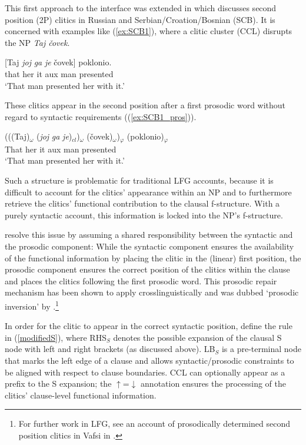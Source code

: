 \documentclass[output=paper,hidelinks]{langscibook}
\begin{document}
This first approach to the interface was extended in \citet{boegel-etal2010} which discusses second position (2P) clitics in Russian and Serbian/Croation/Bosnian (SCB). It is concerned with examples like (\ref{ex:SCB1}), where a clitic cluster (CCL) disrupts the NP {\em Taj \v{c}ovek}. 


\ea\label{ex:SCB1}
\gll 
{[}Taj {\em joj} {\em  ga} {\em je} \v{c}ovek]  poklonio. \\
\phantom{[}that her it {\sc aux} man presented\\
\glt `That man presented her with it.' \hfill \citep{Schuetze1994}
\z

\noindent These clitics appear in the second position after a first prosodic word without regard to syntactic requirements ((\ref{ex:SCB1_pros})).

\ea\label{ex:SCB1_pros}
\gll
(((Taj)$_{\omega}$ ({\em joj}  {\em ga}  {\em je})$_{cl}$)$_{\omega}$ (\v{c}ovek)$_{\omega}$)$_\varphi$ (poklonio)$_\varphi$\\
\phantom{(((}That \phantom{(}her it {\sc aux} \phantom{(}man \phantom{(}presented\\
\glt`That man presented her with it.'
\z

\noindent Such a structure is problematic for traditional LFG accounts, because it is difficult to account for the clitics' appearance within an NP and to furthermore retrieve the clitics' functional contribution to the clausal f-structure. With a purely syntactic account, this information is locked into the NP's f-structure.

\citet{boegel-etal2010} resolve this issue by assuming a shared responsibility between the syntactic and the prosodic component: While the syntactic component ensures the availability of the functional information by placing the clitic in the (linear) first position, the prosodic component ensures the correct position of the clitics within the clause and places the clitics following the first prosodic word. This prosodic repair mechanism has been shown to apply crosslinguistically and was dubbed `prosodic inversion' by \citet{Halpern95}.\footnote{For further work in LFG, see an account of prosodically determined second position clitics in Vafsi in \citet{Boegeletal2018}.}

In order for the clitic to appear in the correct syntactic position, \citet{boegel-etal2010} define the rule in (\ref{modifiedS}), where  RHS$_S$ denotes the possible expansion of the clausal S node with left and right brackets (as discussed above).   LB$_S$ is a pre-terminal node that marks the left edge of a clause and allows syntactic/prosodic constraints to be aligned with respect to clause boundaries. CCL can optionally appear as a prefix to the S expansion; the $\uparrow$=$\downarrow$ annotation ensures the processing of the clitics' clause-level functional information.
\end{document}
